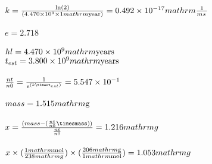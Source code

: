 \documentclass{article}
\begin{document}
\\$k=\frac{\text{ln}(2)}{(4.470\times10^{9}\times1\\mathrm{\mathrm{year}})}=0.492\times10^{-17}\\mathrm{\frac{1}{ms\,}}$\\
\\$e=2.718$\\
\\$hl=4.470\times10^{9}\\mathrm{\mathrm{years}}$\\
$t_{est}=3.800\times10^{9}\\mathrm{\mathrm{years}}$\\
\\$\frac{nt}{n0}=\frac{1}{e^{(k\timest_{est})}}=5.547\times10^{-1}$\\
\\$mass=1.515\\mathrm{\mathrm{g}}$\\
\\$x=\frac{(mass-(\frac{nt}{n0}\timesmass))}{\frac{nt}{n0}}=1.216\\mathrm{g\,}$\\
\\$x\times(\frac{1\\mathrm{\mathrm{mol}}}{238\\mathrm{\mathrm{g}}})\times(\frac{206\\mathrm{\mathrm{g}}}{1\\mathrm{\mathrm{mol}}})=1.053\\mathrm{g\,}$\\
\end{document}
